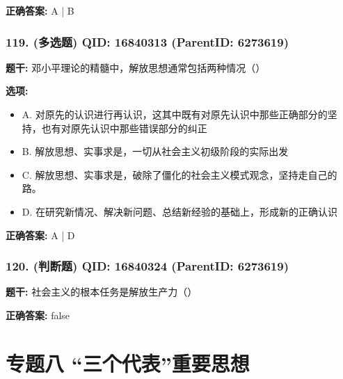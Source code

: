 \documentclass[12pt,UTF8]{ctexart}
\begin{document}
\textbf{正确答案:}
A | B

\vspace{0.3em}\hrulefill\vspace{0.7em}

\subsubsection*{119. (多选题) \small QID: 16840313 (ParentID: 6273619)}

\textbf{题干:}
邓小平理论的精髓中，解放思想通常包括两种情况（）



\textbf{选项:}
\begin{itemize}[leftmargin=*]

  \item A. 对原先的认识进行再认识，这其中既有对原先认识中那些正确部分的坚持，也有对原先认识中那些错误部分的纠正

  \item B. 解放思想、实事求是，一切从社会主义初级阶段的实际出发

  \item C. 解放思想、实事求是，破除了僵化的社会主义模式观念，坚持走自己的路。

  \item D. 在研究新情况、解决新问题、总结新经验的基础上，形成新的正确认识

\end{itemize}

\textbf{正确答案:}
A | D

\vspace{0.3em}\hrulefill\vspace{0.7em}

\subsubsection*{120. (判断题) \small QID: 16840324 (ParentID: 6273619)}

\textbf{题干:}
社会主义的根本任务是解放生产力（）



\textbf{正确答案:}
false

\vspace{0.3em}\hrulefill\vspace{0.7em}

\section*{专题八 “三个代表”重要思想}
\hrulefill
\end{document}
